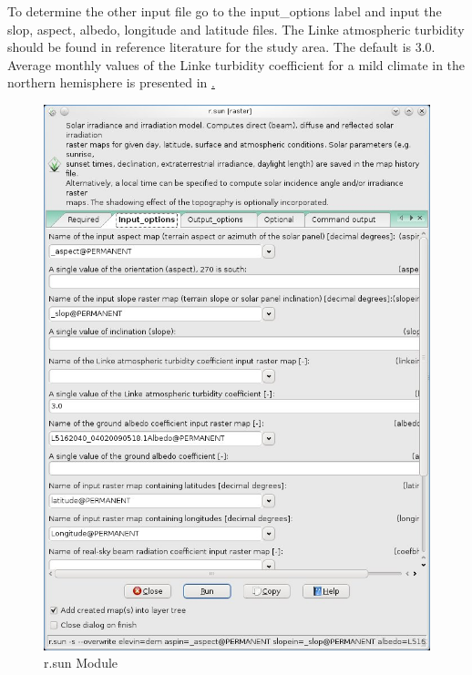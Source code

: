 To determine the other input file go to the input\_options label and input the slop, aspect, albedo, longitude and latitude files. The Linke atmospheric turbidity should be found in reference literature for the study area. The default is 3.0. Average monthly values of the Linke turbidity coefficient for a mild climate in the northern hemisphere is presented in \href{tab:001}.\newline

\begin{figure}[htbp]
   \centering
   \includegraphics[scale=0.4]{gipe023.png}
   \caption{r.sun Module}
   \label{fig:gipe023}
\end{figure}

